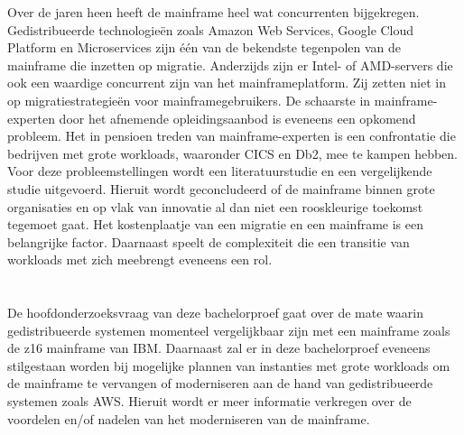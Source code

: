 Over de jaren heen heeft de mainframe heel wat concurrenten bijgekregen. Gedistribueerde technologieën zoals Amazon Web Services, Google Cloud Platform en Microservices zijn één van de bekendste tegenpolen van de mainframe die inzetten op migratie. Anderzijds zijn er Intel- of AMD-servers die ook een waardige concurrent zijn van het mainframeplatform. Zij zetten niet in op migratiestrategieën voor mainframegebruikers. De schaarste in mainframe-experten door het afnemende opleidingsaanbod is eveneens een opkomend probleem. Het in pensioen treden van mainframe-experten is een confrontatie die bedrijven met grote workloads, waaronder CICS en Db2, mee te kampen hebben. Voor deze probleemstellingen wordt een literatuurstudie en een vergelijkende studie uitgevoerd. Hieruit wordt geconcludeerd of de mainframe binnen grote organisaties en op vlak van innovatie al dan niet een rooskleurige toekomst tegemoet gaat. Het kostenplaatje van een migratie en een mainframe is een belangrijke factor. Daarnaast speelt de complexiteit die een transitie van workloads met zich meebrengt eveneens een rol. 

\section{}
\label{sec:onderzoeksvraag}

De hoofdonderzoeksvraag van deze bachelorproef gaat over de mate waarin gedistribueerde systemen momenteel vergelijkbaar zijn met een mainframe zoals de z16 mainframe van IBM. Daarnaast zal er in deze bachelorproef eveneens stilgestaan worden bij mogelijke plannen van instanties met grote workloads om de mainframe te vervangen of moderniseren aan de hand van gedistribueerde systemen zoals AWS. Hieruit wordt er meer informatie verkregen over de voordelen en/of nadelen van het moderniseren van de mainframe.

\section{}
\label{sec:onderzoeksdoelstelling}

\subsection{}

